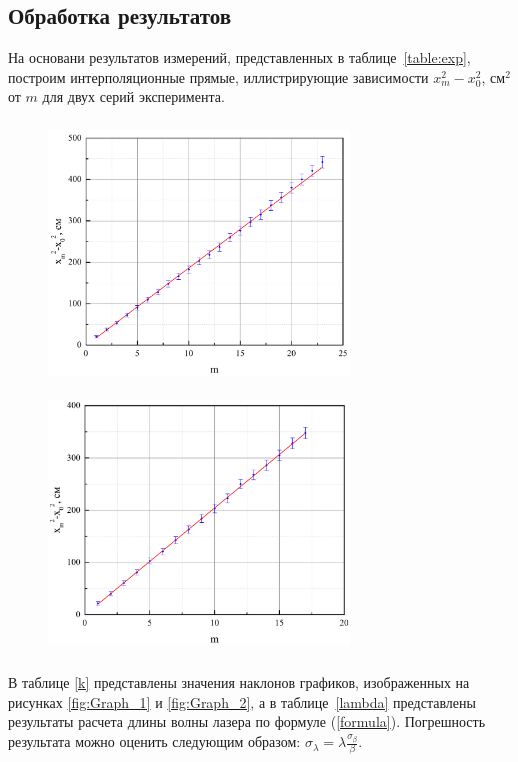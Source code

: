\documentclass[a4paper,12pt]{article} %
\begin{document}
	\subsection{Обработка результатов}
		На основани результатов измерений, представленных в таблице~\ref{table:exp}, построим интерполяционные прямые, иллистрирующие зависимости $x_m^2-x_0^2$, см$^2$ от $m$ для двух серий эксперимента.
		\begin{figure}[h!]
			\begin{floatrow}
				{\includegraphics[width=8cm,height=7cm]{Graph1}}
				{\includegraphics[width=8cm,height=7cm]{Graph2}}         
			\end{floatrow}
		\end{figure}
		
		В таблице \ref{k} представлены значения наклонов графиков, изображенных на рисунках \ref{fig:Graph_1} и \ref{fig:Graph_2}, а в таблице~\ref{lambda} представлены результаты расчета длины волны лазера по формуле (\ref{formula}). Погрешность результата можно оценить следующим образом: $\sigma_\lambda = \lambda \frac{\sigma_\beta}{\beta}$.
		
\end{document}
